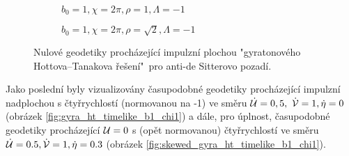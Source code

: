 \begin{figure}[H]
\begin{subfigure}[b]{0.48\textwidth}
        \caption{$b_0=1, \chi=2\pi, \rho=1, \Lambda = -1$}
    \end{subfigure}
    \hfill
    \begin{subfigure}[b]{0.48\textwidth}
        \caption{$b_0=1, \chi=2\pi, \rho=\sqrt{2}, \Lambda = -1$}
    \end{subfigure}
    \caption{Nulové geodetiky procházející impulzní plochou "gyratonového Hottova--Tanakova řešení"\ pro anti-de Sitterovo pozadí.}
    \label{fig:gyra_ht_null_b1_chi12_lmb-1}
\end{figure}

Jako poslední byly vizualizovány časupodobné geodetiky procházející impulzní nadplochou s čtyřrychlostí (normovanou na -1) ve směru $\dot {\mathcal{U}} = 0,5,~ \dot {\mathcal{V}} = 1, \dot \eta = 0$ (obrázek \ref{fig:gyra_ht_timelike_b1_chi1}) a dále, pro úplnost, časupodobné
geodetiky procházející $\mathcal{U} = 0$ s (opět normovanou) čtyřrychlostí ve směru $\dot {\mathcal{U}} = 0.5, \dot {\mathcal{V}} = 1, \dot \eta = 0.3$ (obrázek \ref{fig:skewed_gyra_ht_timelike_b1_chi1}).

